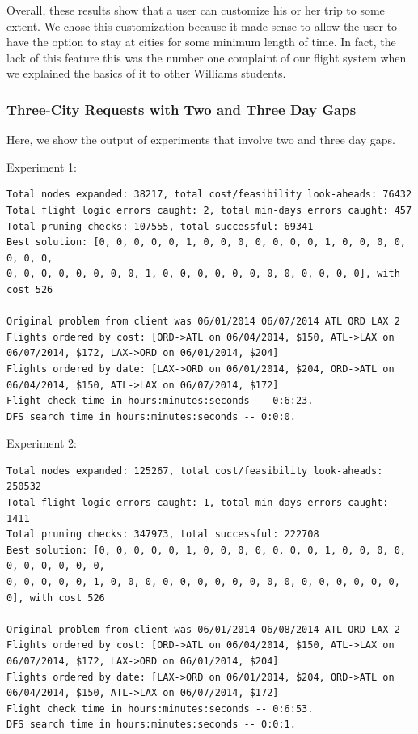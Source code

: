 \documentclass{article}
\begin{document}
Overall, these results show that a user can customize his or her trip to some extent. We chose this customization because it made sense to allow the
user to have the option to stay at cities for some minimum length of time. In fact, the lack of this feature this was the number one complaint of our
flight system when we explained the basics of it to other Williams students.

\subsubsection{Three-City Requests with Two and Three Day Gaps}

Here, we show the output of experiments that involve two and three day gaps.

Experiment 1:

\scriptsize
\begin{verbatim}
Total nodes expanded: 38217, total cost/feasibility look-aheads: 76432
Total flight logic errors caught: 2, total min-days errors caught: 457
Total pruning checks: 107555, total successful: 69341
Best solution: [0, 0, 0, 0, 0, 1, 0, 0, 0, 0, 0, 0, 0, 1, 0, 0, 0, 0, 0, 0, 0,
0, 0, 0, 0, 0, 0, 0, 0, 1, 0, 0, 0, 0, 0, 0, 0, 0, 0, 0, 0, 0], with cost 526

Original problem from client was 06/01/2014 06/07/2014 ATL ORD LAX 2
Flights ordered by cost: [ORD->ATL on 06/04/2014, $150, ATL->LAX on 06/07/2014, $172, LAX->ORD on 06/01/2014, $204]
Flights ordered by date: [LAX->ORD on 06/01/2014, $204, ORD->ATL on 06/04/2014, $150, ATL->LAX on 06/07/2014, $172]
Flight check time in hours:minutes:seconds -- 0:6:23.
DFS search time in hours:minutes:seconds -- 0:0:0.
\end{verbatim}
\normalsize

Experiment 2:

\scriptsize
\begin{verbatim}
Total nodes expanded: 125267, total cost/feasibility look-aheads: 250532
Total flight logic errors caught: 1, total min-days errors caught: 1411
Total pruning checks: 347973, total successful: 222708
Best solution: [0, 0, 0, 0, 0, 1, 0, 0, 0, 0, 0, 0, 0, 1, 0, 0, 0, 0, 0, 0, 0, 0, 0, 0,
0, 0, 0, 0, 0, 1, 0, 0, 0, 0, 0, 0, 0, 0, 0, 0, 0, 0, 0, 0, 0, 0, 0, 0], with cost 526

Original problem from client was 06/01/2014 06/08/2014 ATL ORD LAX 2
Flights ordered by cost: [ORD->ATL on 06/04/2014, $150, ATL->LAX on 06/07/2014, $172, LAX->ORD on 06/01/2014, $204]
Flights ordered by date: [LAX->ORD on 06/01/2014, $204, ORD->ATL on 06/04/2014, $150, ATL->LAX on 06/07/2014, $172]
Flight check time in hours:minutes:seconds -- 0:6:53.
DFS search time in hours:minutes:seconds -- 0:0:1.
\end{verbatim}
\normalsize
\end{document}
